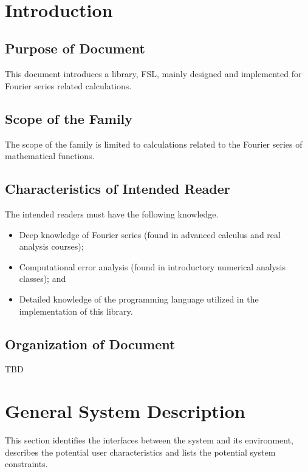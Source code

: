 \documentclass[12pt]{article}
\newcommand{\famname}{FSL} %
\begin{document}
\newpage

\tableofcontents

~\newpage


\section{Introduction}

\subsection{Purpose of Document}
This document introduces a library, \famname, mainly designed and implemented for Fourier series related calculations.

\subsection{Scope of the Family} 
The scope of the family is limited to calculations related to the Fourier series of mathematical functions.

\subsection{Characteristics of Intended Reader} 
The intended readers must have the following knowledge.
\begin{itemize}
	\item Deep knowledge of Fourier series (found in advanced calculus and real analysis courses);
	\item Computational error analysis (found in introductory numerical analysis classes); and
	\item Detailed knowledge of the programming language utilized in the implementation of this library.
	
\end{itemize}

\subsection{Organization of Document}
TBD

\section{General System Description}

This section identifies the interfaces between the system and its environment,
describes the potential user characteristics and lists the potential system
constraints.
\end{document}
